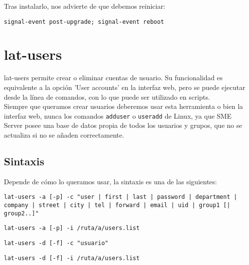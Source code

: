 Tras instalarlo, nos advierte de que debemos reiniciar:

\begin{lstlisting}
signal-event post-upgrade; signal-event reboot
\end{lstlisting}

\section{lat-users}
lat-users permite crear o eliminar cuentas de usuario. Su funcionalidad es equivalente a la opción 'User accounts' en la interfaz web, pero se puede ejecutar desde la línea de comandos, con lo que puede ser utilizado en scripts.\\

Siempre que queramos crear usuarios deberemos usar esta herramienta o bien la interfaz web, nunca los comandos \lstinline!adduser! o \lstinline!useradd! de Linux, ya que SME Server posee una base de datos propia de todos los usuarios y grupos, que no se actualiza si no se añaden correctamente.

\subsection{Sintaxis}
Depende de cómo lo queramos usar, la sintaxis es una de las siguientes:
\begin{lstlisting}
lat-users -a [-p] -c "user | first | last | password | department | company | street | city | tel | forward | email | uid | group1 [| group2..]"
\end{lstlisting}
\begin{lstlisting}
lat-users -a [-p] -i /ruta/a/users.list
\end{lstlisting}
\begin{lstlisting}
lat-users -d [-f] -c "usuario" 
\end{lstlisting}
\begin{lstlisting}
lat-users -d [-f] -i /ruta/a/users.list
\end{lstlisting}

